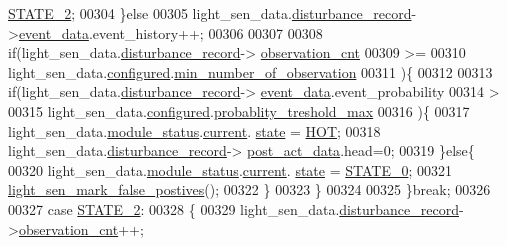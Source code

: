 \begin{DoxyCode}
      \hyperlink{a00021_a66fa48e832a64af4d405511cecc4c752}{STATE\_2};
00304             \}\textcolor{keywordflow}{else}
00305                  light\_sen\_data.\hyperlink{a00024_ac9b38e2c1d3f1013a88d33506c754152}{disturbance\_record}->\hyperlink{a00028_a8c0bda69e71ef674e60da47ad0be9ab0}{event\_data}.event\_history++;
00306 
00307        
00308             \textcolor{keywordflow}{if}(light\_sen\_data.\hyperlink{a00024_ac9b38e2c1d3f1013a88d33506c754152}{disturbance\_record}->
      \hyperlink{a00028_ad5b0bac02ce266b91b2b52a1c3ea1d78}{observation\_cnt}
00309                 >=
00310                 light\_sen\_data.\hyperlink{a00024_a94b2d1f6ea4ab334c74d24984dd27843}{configured}.\hyperlink{a00021_ae8665e8bf422c1482442d6949ba28408}{min\_number\_of\_observation}
00311                )\{
00312                
00313                    \textcolor{keywordflow}{if}(light\_sen\_data.\hyperlink{a00024_ac9b38e2c1d3f1013a88d33506c754152}{disturbance\_record}->
      \hyperlink{a00028_a8c0bda69e71ef674e60da47ad0be9ab0}{event\_data}.event\_probability
00314                     >
00315                     light\_sen\_data.\hyperlink{a00024_a94b2d1f6ea4ab334c74d24984dd27843}{configured}.\hyperlink{a00021_a7e2d217b9c9051d361319180a426851c}{probablity\_treshold\_max}
00316                     )\{
00317                          light\_sen\_data.\hyperlink{a00024_a5a53c391562b059eb744ac679f3765ca}{module\_status}.\hyperlink{a00017_ab8af48cdbba92b3ae39c4470e53af944}{current}.
      \hyperlink{a00017_a6b8d8e916bc56265a3fd279bd26b6d1b}{state} = \hyperlink{a00021_a1eb14cc432874ddacd1934791dbe12a3}{HOT};
00318                          light\_sen\_data.\hyperlink{a00024_ac9b38e2c1d3f1013a88d33506c754152}{disturbance\_record}->
      \hyperlink{a00028_a9c699c0cc82d0baa6e49195f185ab34f}{post\_act\_data}.head=0;
00319                      \}\textcolor{keywordflow}{else}\{
00320                          light\_sen\_data.\hyperlink{a00024_a5a53c391562b059eb744ac679f3765ca}{module\_status}.\hyperlink{a00017_ab8af48cdbba92b3ae39c4470e53af944}{current}.
      \hyperlink{a00017_a6b8d8e916bc56265a3fd279bd26b6d1b}{state} = \hyperlink{a00021_ad6739dbbe5581cac99b7dc8a5e09949c}{STATE\_0};
00321                          \hyperlink{a00047_acef1622ec5c40fe90bf6184813716e34}{light\_sen\_mark\_false\_postives}();
00322                     \}
00323              \}
00324              
00325         \}\textcolor{keywordflow}{break};
00326 
00327           \textcolor{keywordflow}{case} \hyperlink{a00021_a66fa48e832a64af4d405511cecc4c752}{STATE\_2}:
00328         \{
00329             light\_sen\_data.\hyperlink{a00024_ac9b38e2c1d3f1013a88d33506c754152}{disturbance\_record}->\hyperlink{a00028_ad5b0bac02ce266b91b2b52a1c3ea1d78}{observation\_cnt}++;

\end{DoxyCode}
